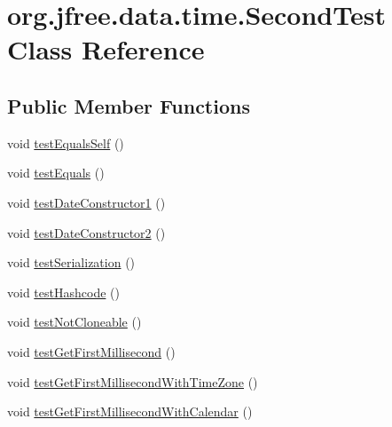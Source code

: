 \hypertarget{classorg_1_1jfree_1_1data_1_1time_1_1_second_test}{}\section{org.\+jfree.\+data.\+time.\+Second\+Test Class Reference}
\label{classorg_1_1jfree_1_1data_1_1time_1_1_second_test}
\subsection*{Public Member Functions}
\begin{DoxyCompactItemize}
\item 
void \mbox{\hyperlink{classorg_1_1jfree_1_1data_1_1time_1_1_second_test_a4036c35cabe27e0f6cdfe053da944da4}{test\+Equals\+Self}} ()
\item 
void \mbox{\hyperlink{classorg_1_1jfree_1_1data_1_1time_1_1_second_test_ac9b885051ada6ae1b0b8c0767ce2165a}{test\+Equals}} ()
\item 
void \mbox{\hyperlink{classorg_1_1jfree_1_1data_1_1time_1_1_second_test_a09e0c8226d006fc952613b5492e0744b}{test\+Date\+Constructor1}} ()
\item 
void \mbox{\hyperlink{classorg_1_1jfree_1_1data_1_1time_1_1_second_test_ae82c7da672aea39485a8de3097d03ddd}{test\+Date\+Constructor2}} ()
\item 
void \mbox{\hyperlink{classorg_1_1jfree_1_1data_1_1time_1_1_second_test_af0cbe63df586a79fb6692b72b68aeba5}{test\+Serialization}} ()
\item 
void \mbox{\hyperlink{classorg_1_1jfree_1_1data_1_1time_1_1_second_test_a731eda9127a06a1076f9b6b70ef093e2}{test\+Hashcode}} ()
\item 
void \mbox{\hyperlink{classorg_1_1jfree_1_1data_1_1time_1_1_second_test_a8a2c8569d34a7f295a83260cb8e2b96a}{test\+Not\+Cloneable}} ()
\item 
void \mbox{\hyperlink{classorg_1_1jfree_1_1data_1_1time_1_1_second_test_a0ed126157dd9b24e488af3d02446474d}{test\+Get\+First\+Millisecond}} ()
\item 
void \mbox{\hyperlink{classorg_1_1jfree_1_1data_1_1time_1_1_second_test_a94d65331a96910552529fb06ead5e9e0}{test\+Get\+First\+Millisecond\+With\+Time\+Zone}} ()
\item 
void \mbox{\hyperlink{classorg_1_1jfree_1_1data_1_1time_1_1_second_test_a5a6d98228a01854e8a6b69bd0d534011}{test\+Get\+First\+Millisecond\+With\+Calendar}} ()
\item 

\end{DoxyCompactItemize}
